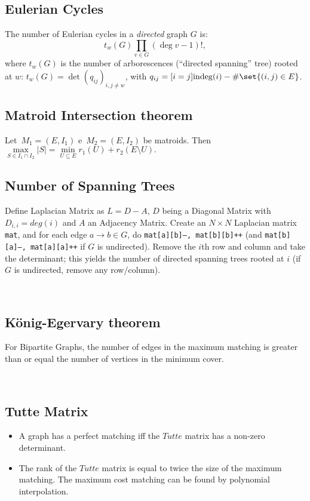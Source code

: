 \subsection{Eulerian Cycles}
The number of Eulerian cycles in a \emph{directed} graph $G$ is:
\begin{equation*}
	t_w(G) \prod_{v \in G} (\deg v - 1)!,
\end{equation*}
where $t_w(G)$ is the number of arborescences (``directed spanning'' tree) rooted at $w$: $t_w(G) = \det\left( q_{ij} \right)_{i,j \neq w}$, with $q_{ij} = [i=j] \mathrm{indeg}(i) - \# \set{(i,j) \in E}$.\\


\subsection{Matroid Intersection theorem}
Let~$M_1 = (E, I_1)$ e~$M_2 = (E, I_2)$ be matroids. Then
$ \max\limits_{S \in I_1 \cap I_2}{|S|} = \min\limits_{U \subseteq E}{r_1(U) + r_2(E \setminus U)}.$\\

\subsection{Number of Spanning Trees}
		Define Laplacian Matrix as $L = D - A$, $D$ being a Diagonal Matrix with $D_{i,i} = deg(i)$ and $A$ an Adjacency Matrix.
		Create an $N\times N$ Laplacian matrix \texttt{mat}, and for each edge $a \rightarrow b \in G$, do
		\texttt{mat[a][b]--, mat[b][b]++} (and \texttt{mat[b][a]--, mat[a][a]++} if $G$ is undirected).
		Remove the $i$th row and column and take the determinant; this yields the number of directed spanning trees rooted at $i$
		(if $G$ is undirected, remove any row/column).



\


\subsection{König-Egervary theorem}
	For Bipartite Graphs, the number of edges in the maximum matching is greater than or equal the number of vertices in the minimum cover.



\



\subsection{Tutte Matrix}
	\begin{itemize}
	\item A graph has a perfect matching iff the $Tutte$ matrix has a non-zero determinant.

	\item The rank of the $Tutte$ matrix is equal to twice the size of the maximum matching. The maximum cost matching can be found by polynomial interpolation.
	\end{itemize}
